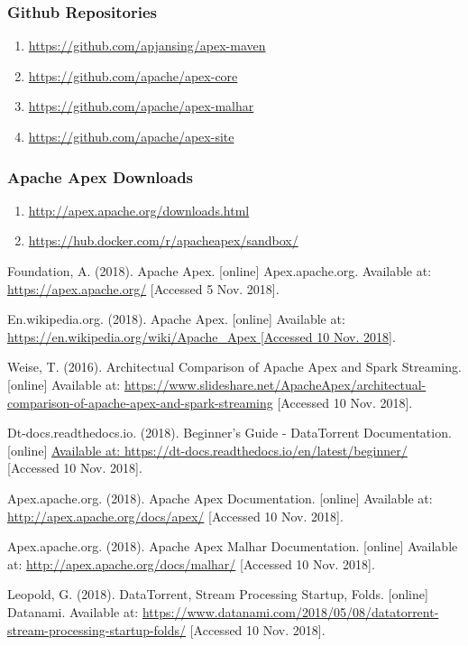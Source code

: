 \documentclass[11 pt]{IEEEtran}
\begin{document}
 \subsubsection{Github Repositories}
 \begin{enumerate}
  \item[] \url{https://github.com/apjansing/apex-maven}
	\item[] \url{https://github.com/apache/apex-core}
	\item[] \url{https://github.com/apache/apex-malhar}
	\item[] \url{https://github.com/apache/apex-site}
 \end{enumerate}

\subsubsection{Apache Apex Downloads}
\begin{enumerate}
	\item[] \url{http://apex.apache.org/downloads.html}
	\item[] \url{https://hub.docker.com/r/apacheapex/sandbox/}
\end{enumerate}
  
\begin{thebibliography}{99}
Foundation, A. (2018). Apache Apex. [online] Apex.apache.org. Available at: \url{https://apex.apache.org/} [Accessed 5 Nov. 2018].

En.wikipedia.org. (2018). Apache Apex. [online] Available at: \url{https://en.wikipedia.org/wiki/Apache_Apex [Accessed 10 Nov. 2018]}.

Weise, T. (2016). Architectual Comparison of Apache Apex and Spark Streaming. [online] Available at: \url{https://www.slideshare.net/ApacheApex/architectual-comparison-of-apache-apex-and-spark-streaming} [Accessed 10 Nov. 2018].

Dt-docs.readthedocs.io. (2018). Beginner's Guide - DataTorrent Documentation. [online] \url{Available at: https://dt-docs.readthedocs.io/en/latest/beginner/} [Accessed 10 Nov. 2018].

Apex.apache.org. (2018). Apache Apex Documentation. [online] Available at: \url{http://apex.apache.org/docs/apex/} [Accessed 10 Nov. 2018].

Apex.apache.org. (2018). Apache Apex Malhar Documentation. [online] Available at: \url{http://apex.apache.org/docs/malhar/} [Accessed 10 Nov. 2018].

Leopold, G. (2018). DataTorrent, Stream Processing Startup, Folds. [online] Datanami. Available at: \url{https://www.datanami.com/2018/05/08/datatorrent-stream-processing-startup-folds/} [Accessed 10 Nov. 2018].
\end{thebibliography}
\end{document}
